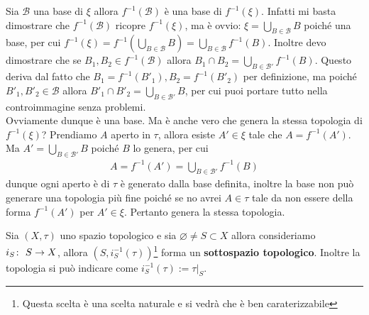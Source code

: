 \begin{remark}
	\label{remark:induced_bases_by_a_map}
	Sia $\mathcal{B}$ una base di $\xi$ allora $f^{-1}(\mathcal{B})$ è una base di $f^{-1}(\xi)$. Infatti mi basta dimostrare che $f^{-1}(\mathcal{B})$ ricopre $f^{-1}(\xi)$, ma è ovvio: $\xi = \bigcup_{B \in \mathcal{B}} B$ poiché una base, per cui $f^{-1}(\xi) = f^{-1}(\bigcup_{B \in \mathcal{B}} B) = \bigcup_{B \in \mathcal{B}} f^{-1}(B)$. Inoltre devo dimostrare che se $B_1, B_2 \in f^{-1}(\mathcal{B})$ allora $B_1 \cap B_2 = \bigcup_{B \in \mathcal{B}'}f^{-1}(B)$. Questo deriva dal fatto che $B_1 = f^{-1}(B'_1), B_2 = f^{-1}(B'_2)$ per definizione, ma poiché $B'_1, B'_2 \in \mathcal{B}$ allora $B'_1 \cap B'_2 = \bigcup_{B \in \mathcal{B}'} B$, per cui puoi portare tutto nella controimmagine senza problemi. \\
	
	Ovviamente dunque è una base. Ma è anche vero che genera la stessa topologia di $f^{-1}(\xi)$? Prendiamo $A$ aperto in $\tau$, allora esiste $A' \in \xi$ tale che $A = f^{-1}(A')$. Ma $A' = \bigcup_{B \in \mathcal{B}'} B$ poiché $B$ lo genera, per cui
	\begin{equation}
	\begin{aligned}
		A = f^{-1}(A') = \bigcup_{B \in \mathcal{B}'} f^{-1}(B) 
	\end{aligned}
	\end{equation}
	dunque ogni aperto è di $\tau$ è generato dalla base definita, inoltre la base non può generare una topologia più fine poiché se no avrei $A \in \tau$ tale da non essere della forma $f^{-1}(A')$ per $A' \in \xi$. Pertanto genera la stessa topologia.
\end{remark}

\begin{definition}
	Sia $(X,\tau)$ uno spazio topologico e sia $\varnothing \neq S \subset X$ allora consideriamo $i_S \colon\ S \rightarrow X$, allora $(S, i^{-1}_S(\tau))$\footnote{Questa scelta è una scelta naturale e si vedrà che è ben caraterizzabile} forma un \textbf{sottospazio topologico}. Inoltre la topologia si può indicare come $i^{-1}_S(\tau) := \tau|_S$. 
\end{definition}

